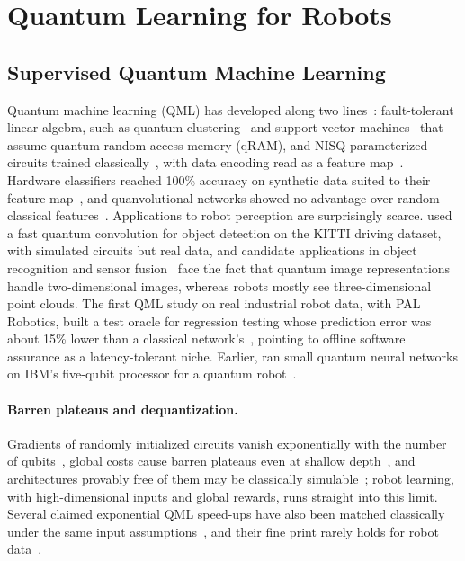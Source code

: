 \documentclass[acmsmall,screen,review]{acmart}
\begin{document}
\section{Quantum Learning for Robots}\label{sec:learning}

\subsection{Supervised Quantum Machine Learning}\label{sec:qml}
Quantum machine learning (QML) has developed along two lines~\cite{Biamonte2017,Schuld2021,Wang2024}: fault-tolerant linear algebra, such as quantum clustering~\cite{Lloyd2014} and support vector machines~\cite{Rebentrost2014} that assume quantum random-access memory (qRAM), and NISQ parameterized circuits trained classically~\cite{Mitarai2018,Farhi2018}, with data encoding read as a feature map~\cite{Schuld2019}. Hardware classifiers reached 100\% accuracy on synthetic data suited to their feature map~\cite{Havlicek2019}, and quanvolutional networks showed no advantage over random classical features~\cite{Henderson2020}. Applications to robot perception are surprisingly scarce. \citet{Roh2025} used a fast quantum convolution for object detection on the KITTI driving dataset, with simulated circuits but real data, and candidate applications in object recognition and sensor fusion~\cite{Petschnigg2019,Yan2024} face the fact that quantum image representations handle two-dimensional images, whereas robots mostly see three-dimensional point clouds. The first QML study on real industrial robot data, with PAL Robotics, built a test oracle for regression testing whose prediction error was about 15\% lower than a classical network's~\cite{Wang2025}, pointing to offline software assurance as a latency-tolerant niche. Earlier, \citet{Goncalves2018} ran small quantum neural networks on IBM's five-qubit processor for a quantum robot~\cite{Benioff1998}.

\paragraph{Barren plateaus and dequantization.} Gradients of randomly initialized circuits vanish exponentially with the number of qubits~\cite{McClean2018}, global costs cause barren plateaus even at shallow depth~\cite{Cerezo2021b}, and architectures provably free of them may be classically simulable~\cite{Larocca2025}; robot learning, with high-dimensional inputs and global rewards, runs straight into this limit. Several claimed exponential QML speed-ups have also been matched classically under the same input assumptions~\cite{Tang2019,Chia2020}, and their fine print rarely holds for robot data~\cite{Aaronson2015}.
\end{document}

